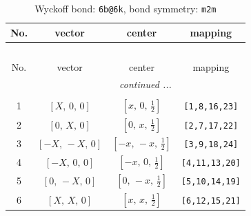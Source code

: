 \documentclass[fleqn,8pt]{jsarticle}
\begin{document}
\renewcommand{\arraystretch}{1.2}
\begin{longtable}{cccc}
\caption{Wyckoff bond: {\tt 6b@6k}, bond symmetry: {\tt m2m}}
 \\
 \hline \hline
No. & vector & center & mapping \\ \hline \endfirsthead

\multicolumn{3}{l}{\tablename\ \thetable{}} \\
 \hline \hline
No. & vector & center & mapping \\ \hline \endhead

 \hline \hline
\multicolumn{3}{r}{\footnotesize\it continued ...} \\ \endfoot

 \hline \hline
\multicolumn{3}{r}{} \\ \endlastfoot

1 & $\left[ X,\, 0,\, 0 \right]$ & $\left[ x,\, 0,\, \frac{1}{2} \right]$ & {\tt [1,8,16,23]} \\ \hline
2 & $\left[ 0,\, X,\, 0 \right]$ & $\left[ 0,\, x,\, \frac{1}{2} \right]$ & {\tt [2,7,17,22]} \\ \hline
3 & $\left[ - X,\, - X,\, 0 \right]$ & $\left[ - x,\, - x,\, \frac{1}{2} \right]$ & {\tt [3,9,18,24]} \\ \hline
4 & $\left[ - X,\, 0,\, 0 \right]$ & $\left[ - x,\, 0,\, \frac{1}{2} \right]$ & {\tt [4,11,13,20]} \\ \hline
5 & $\left[ 0,\, - X,\, 0 \right]$ & $\left[ 0,\, - x,\, \frac{1}{2} \right]$ & {\tt [5,10,14,19]} \\ \hline
6 & $\left[ X,\, X,\, 0 \right]$ & $\left[ x,\, x,\, \frac{1}{2} \right]$ & {\tt [6,12,15,21]} \\
\end{longtable}
\renewcommand{\arraystretch}{1.2}
\end{document}
